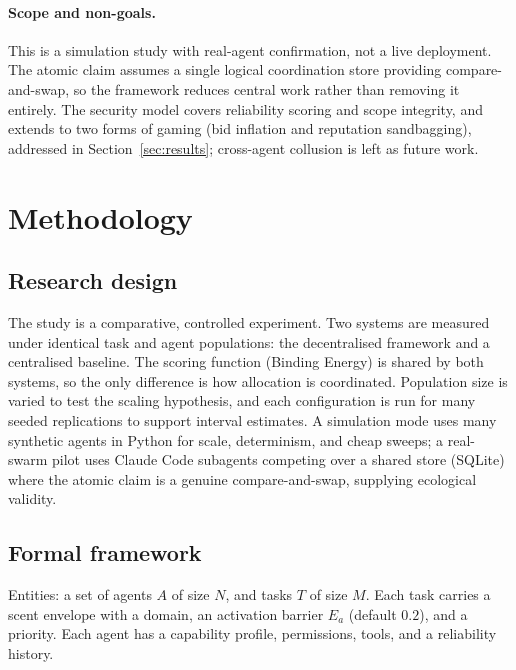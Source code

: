 \documentclass[11pt]{article}
\begin{document}
\paragraph{Scope and non-goals.} This is a simulation study with real-agent confirmation, not a live deployment. The atomic claim assumes a single logical coordination store providing compare-and-swap, so the framework reduces central work rather than removing it entirely. The security model covers reliability scoring and scope integrity, and extends to two forms of gaming (bid inflation and reputation sandbagging), addressed in Section~\ref{sec:results}; cross-agent collusion is left as future work.

\section{Methodology}

\subsection{Research design}
The study is a comparative, controlled experiment. Two systems are measured under identical task and agent populations: the decentralised framework and a centralised baseline. The scoring function (Binding Energy) is shared by both systems, so the only difference is how allocation is coordinated. Population size is varied to test the scaling hypothesis, and each configuration is run for many seeded replications to support interval estimates. A simulation mode uses many synthetic agents in Python for scale, determinism, and cheap sweeps; a real-swarm pilot uses Claude Code subagents competing over a shared store (SQLite) where the atomic claim is a genuine compare-and-swap, supplying ecological validity.

\subsection{Formal framework}
Entities: a set of agents $A$ of size $N$, and tasks $T$ of size $M$. Each task carries a scent envelope with a domain, an activation barrier $E_a$ (default $0.2$), and a priority. Each agent has a capability profile, permissions, tools, and a reliability history.
\end{document}

